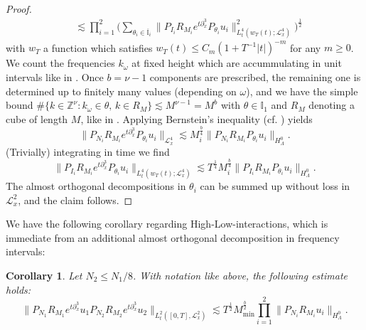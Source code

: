 \documentclass{amsart}
\newtheorem{corollary}[theorem]{Corollary}
\theoremstyle{definition}
\newcommand{\Z}{\mathbb{Z}}
\begin{document}
\begin{proof}
\begin{equation*}
\begin{split}
&\lesssim \prod_{i=1}^2 \big( \sum_{\theta_i \in \overline{\mathbb{I}}_i} \| P_{I_i} R_{M_i} e^{t \partial_x^3} P_{\theta_i} u_{i } \|^2_{L_t^4(w_{T}(t);\mathcal{L}^4_x)} \big)^{\frac{1}{2}} 
\end{split}
\end{equation*}
with $w_{T}$ a function which satisfies $w_{T}(t) \leq C_m (1+T^{-1} |t|)^{-m}$ for any $m \geq 0$.
We count the frequencies $k_{\omega}$ at fixed height which are accummulating in unit intervals like in \cite{Schippa2025Quasiperiodic}. Once $b= \nu-1$ components are prescribed, the remaining one is determined up to finitely many values (depending on $\omega$), and we have the simple bound $\# \{ k \in \Z^{\nu} : k_\omega \in \theta, \, k \in R_{M} \} \lesssim M^{\nu-1} = M^b$ with $\theta \in \mathbb{I}_1$ and $R_M$ denoting a cube of length $M$, like in \cite{Schippa2025Quasiperiodic}. Applying Bernstein's inequality (cf. \cite{Schippa2025Quasiperiodic}) yields
\begin{equation*}
\| P_{N_i} R_{M_i} e^{t \partial_x^3} P_{\theta_i} u_{i} \|_{\mathcal{L}^4_x} \lesssim M_i^{\frac{b}{4}} \| P_{N_i} R_{M_i} P_{\theta_i} u_i \|_{H^0_\Lambda}.
\end{equation*}
(Trivially) integrating in time we find
\begin{equation*}
\| P_{I_i} R_{M_i} e^{t \partial_x^3} P_{\theta_i} u_{i } \|_{L_t^4(w_{T}(t);\mathcal{L}^4_x)} \lesssim T^{\frac{1}{4}} M_i^{\frac{b}{4}} \| P_{I_i} R_{M_i} P_{\theta_i} u_{i } \|_{H^0_\Lambda}.
\end{equation*}
The almost orthogonal decompositions in $\theta_i$ can be summed up without loss in $\mathcal{L}^2_x$, and the claim follows.
\end{proof}



We have the following corollary regarding High-Low-interactions, which is immediate from an additional almost orthogonal decomposition in frequency intervals:
\begin{corollary}
\label{cor:BilinearHighLow}
Let $N_2 \leq N_1/8$. With notation like above, the following estimate holds:
\begin{equation*}
\| P_{N_1} R_{M_1} e^{t \partial_x^3} u_1 P_{N_2} R_{M_2} e^{t \partial_x^3} u_2 \|_{L_t^2([0,T],\mathcal{L}^2_x)} \lesssim T^{\frac{1}{2}} M_{\min}^{\frac{b}{2}} \prod_{i=1}^2 \| P_{N_i} R_{M_i} u_i \|_{H^0_\Lambda}.
\end{equation*}
\end{corollary}
\end{document}
